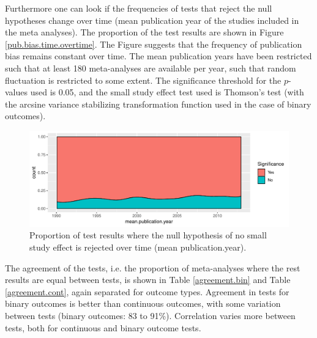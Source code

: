 \documentclass[11pt,a4paper,twoside]{book}\usepackage[]{graphicx}\usepackage[]{color}
\newenvironment{knitrout}{}{} %
\begin{document}

Furthermore one can look if the frequencies of tests that reject the null hypotheses change over time (mean publication year of the studies included in the meta analyses). The proportion of the test results are shown in Figure \ref{pub.bias.time.overtime}. The Figure suggests that the frequency of publication bias remains constant over time. The mean publication years have been restricted such that at least 180 meta-analyses are available per year, such that random fluctuation is restricted to some extent. The significance threshold for the $p$-values used is 0.05, and the small study effect test used is Thomson's test (with the arcsine variance stabilizing transformation function used in the case of binary outcomes).

\begin{figure}
\begin{knitrout}
\color{fgcolor}

{\centering \includegraphics[width=\textwidth-3cm]{figure/ch02_figunnamed-chunk-21-1} 

}



\end{knitrout}
\caption{Proportion of test results where the null hypothesis of no small study effect is rejected over time (mean publication.year).}
\label{pub.bias.overtime}
\end{figure}


The agreement of the tests, i.e. the proportion of meta-analyses where the rest results are equal between tests, is shown in Table \ref{agreement.bin} and Table \ref{agreement.cont}, again separated for outcome types. Agreement in tests for binary outcomes is better than continuous outcomes, with some variation between tests (binary outcomes: 83 to 91\%). Correlation varies more between tests, both for continuous and binary outcome tests.
\end{document}
